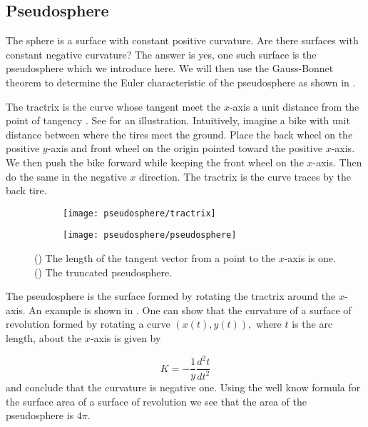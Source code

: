 \subsection{Pseudosphere}
\label{sec:pseudosphere}

The sphere is a surface with constant positive curvature.
Are there surfaces with constant negative curvature?
The answer is yes, one such surface is the pseudosphere
which we introduce here. We will then use the Gauss-Bonnet
theorem to determine the Euler characteristic of the pseudosphere as
shown in \cite{pseudo-app}.


The tractrix is the curve whose tangent meet the $x$-axis a unit distance
from the point of tangency \cite{thurston}. See  for an illustration.
Intuitively, imagine a bike with unit distance between where the tires meet the ground.
Place the back wheel on the positive $y$-axis and front wheel on the origin pointed
toward the positive $x$-axis. We then push the bike forward while keeping the front
wheel on the $x$-axis. Then do the same in the negative $x$ direction.
The tractrix is the curve traces by the back tire. 


\begin{figure}[htb]
    \captionsetup[subfigure]{justification=centering}
    \centering
    \begin{subfigure}[b]{0.4\textwidth}
        \texttt{[image: pseudosphere/tractrix]}
       \subcaption{}\label{fig:tractrix}
    \end{subfigure}
        \hspace{1cm}
        \begin{subfigure}[b]{0.4\textwidth}
        \texttt{[image: pseudosphere/pseudosphere]}
        \subcaption{}\label{fig:pseudosphere}
        \end{subfigure}
    \caption{() The length of the tangent vector from a point to the $x$-axis is one.
        () The truncated pseudosphere.
    }
    \label{fig:tractrix-pseudosphere}
\end{figure}



The pseudosphere is the surface formed by rotating the tractrix around the $x$-axis.
An example is shown in .
One can show that the curvature of a surface of revolution formed by rotating a curve
$(x(t),y(t)),$ where $t$ is the arc length, about the $x$-axis is given by

$$K=-\frac{1}{y}\frac{d^2t}{dt^2}$$
and conclude that the curvature is negative one.
Using the well know formula for the surface area of a surface of revolution
we see that the area of the pseudosphere is $4\pi$.

